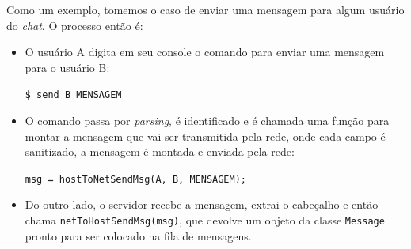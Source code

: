 \documentclass[11pt]{article}
\newcommand{\tit}[1]{\textit{#1}}
\newcommand{\ttt}[1]{\texttt{#1}}
\begin{document}
Como um exemplo, tomemos o caso de enviar uma mensagem para algum usuário
do \tit{chat}. 
O processo então é:
\begin{itemize}
	\item O usuário A digita em seu console o comando para enviar uma mensagem
		para o usuário B\@:

	\ttt{\$ send B MENSAGEM}
	\item O comando passa por \tit{parsing}, é identificado e é chamada
		uma função para montar a mensagem que vai ser transmitida pela rede,
		onde cada campo é sanitizado, a mensagem é montada e enviada pela rede:

	\ttt{msg = hostToNetSendMsg(A, B, MENSAGEM);}

	\item Do outro lado, o servidor recebe a mensagem, extrai o cabeçalho e 
		então chama \ttt{netToHostSendMsg(msg)}, que devolve um objeto da
		classe \ttt{Message} pronto para ser colocado na fila de mensagens.
\end{itemize}
\end{document}
